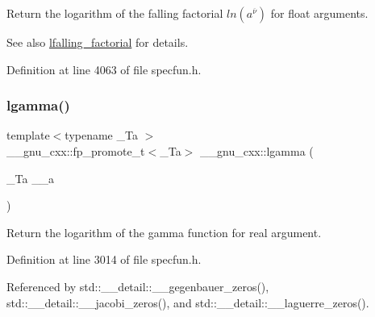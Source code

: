 Return the logarithm of the falling factorial $ ln(a^{\overline{\nu}})$ for float arguments.

\begin{DoxySeeAlso}{See also}
\hyperlink{group__gnu__math__spec__func_ga2032c10640d5010666d60d9faec86c32}{lfalling\+\_\+factorial} for details. 
\end{DoxySeeAlso}


Definition at line 4063 of file specfun.\+h.

\mbox{\label{group__gnu__math__spec__func_ga40fa5127f7c419ed1d8f1c6a6f96ea9b}} 
\subsubsection{\texorpdfstring{lgamma()}{lgamma()}\hspace{0.1cm}{\footnotesize\ttfamily [1/2]}}
{\footnotesize\ttfamily template$<$typename \+\_\+\+Ta $>$ \\
\+\_\+\+\_\+gnu\+\_\+cxx\+::fp\+\_\+promote\+\_\+t$<$\+\_\+\+Ta$>$ \+\_\+\+\_\+gnu\+\_\+cxx\+::lgamma (\begin{DoxyParamCaption}\item[{\+\_\+\+Ta}]{\+\_\+\+\_\+a }\end{DoxyParamCaption})\hspace{0.3cm}{\ttfamily [inline]}}

Return the logarithm of the gamma function for real argument. 

Definition at line 3014 of file specfun.\+h.



Referenced by std\+::\+\_\+\+\_\+detail\+::\+\_\+\+\_\+gegenbauer\+\_\+zeros(), std\+::\+\_\+\+\_\+detail\+::\+\_\+\+\_\+jacobi\+\_\+zeros(), and std\+::\+\_\+\+\_\+detail\+::\+\_\+\+\_\+laguerre\+\_\+zeros().

\mbox{\label{group__gnu__math__spec__func_ga93530dc48fbf301835215cdffedc42d8}} 
